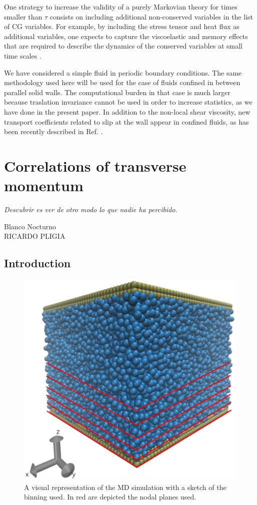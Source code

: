 \documentclass[a4paper,openright,12pt]{book}
\begin{document}
One strategy to increase the validity of a purely Markovian theory for
times   smaller  than   $\tau$   consists   on  including   additional
non-conserved variables in the list  of CG variables.  For example, by
including the stress tensor and heat flux as additional variables, one
expects  to  capture the  viscoelastic  and  memory effects  that  are
required to describe the dynamics  of the conserved variables at small
time scales \cite{Khayat1989,Mryglod1995,Bryk2010}.

We have  considered a  simple fluid  in periodic  boundary conditions.
The  same methodology used here  will be  used for  the case  of fluids
confined in between parallel solid walls.  The computational burden in
that case is much larger  because traslation invariance cannot be used
in order to increase statistics, as we have done in the present paper.
In  addition   to  the   non-local  shear  viscosity,   new  transport
coefficients related to slip at the wall appear in confined fluids, as
has been recently described in Ref. \cite{Camargo2018, III}.



\chapter{Correlations of transverse momentum}\label{cap.TransMomentum}
\epigraph{\textit{Descubrir es ver de otro modo lo que nadie ha percibido.}}{Blanco Nocturno \\ RICARDO PLIGIA}
\section{Introduction}



\begin{figure}
    \centering
    \includegraphics[scale=0.3]{system_nodes_walls}
    \caption[Walls box]{A visual representation of the MD simulation with a sketch of the binning used. In red are depicted the nodal planes used.}
    \label{fig:WallsBox}
\end{figure}
\end{document}
